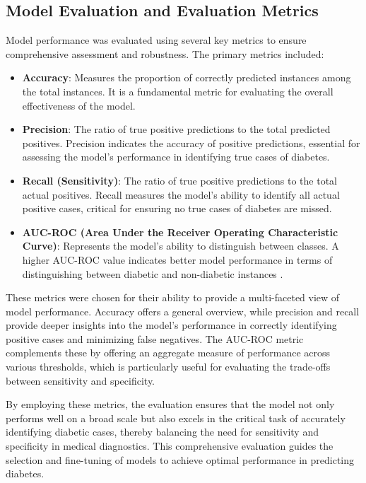 \subsection{Model Evaluation and Evaluation Metrics}

Model performance was evaluated using several key metrics to ensure comprehensive assessment and robustness. The primary metrics included:

\begin{itemize}
    \item \textbf{Accuracy}: Measures the proportion of correctly predicted instances among the total instances. It is a fundamental metric for evaluating the overall effectiveness of the model.
    \item \textbf{Precision}: The ratio of true positive predictions to the total predicted positives. Precision indicates the accuracy of positive predictions, essential for assessing the model's performance in identifying true cases of diabetes.
    \item \textbf{Recall (Sensitivity)}: The ratio of true positive predictions to the total actual positives. Recall measures the model’s ability to identify all actual positive cases, critical for ensuring no true cases of diabetes are missed.
    \item \textbf{AUC-ROC (Area Under the Receiver Operating Characteristic Curve)}: Represents the model's ability to distinguish between classes. A higher AUC-ROC value indicates better model performance in terms of distinguishing between diabetic and non-diabetic instances \cite{Ref14}.
\end{itemize}

These metrics were chosen for their ability to provide a multi-faceted view of model performance. Accuracy offers a general overview, while precision and recall provide deeper insights into the model's performance in correctly identifying positive cases and minimizing false negatives. The AUC-ROC metric complements these by offering an aggregate measure of performance across various thresholds, which is particularly useful for evaluating the trade-offs between sensitivity and specificity.

By employing these metrics, the evaluation ensures that the model not only performs well on a broad scale but also excels in the critical task of accurately identifying diabetic cases, thereby balancing the need for sensitivity and specificity in medical diagnostics. This comprehensive evaluation guides the selection and fine-tuning of models to achieve optimal performance in predicting diabetes.


